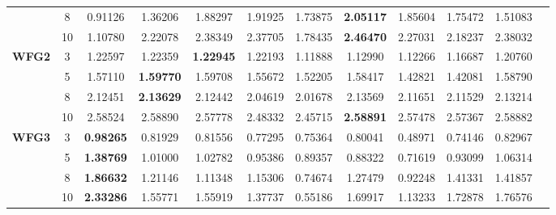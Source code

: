 \documentclass{sig-alternate}
\begin{document}
\begin{table*}[!htb]
\begin{tabular}{|c|c|c|c|c|c|c|c|c|c|c|c|}
& 8          & 0.91126          & 1.36206           & 1.88297               & 1.91925          & 1.73875             & \textbf{2.05117}    & 1.85604            & 1.75472              & 1.51083          \\ \cline{2-11} 
& 10         & 1.10780          & 2.22078           & 2.38349               & 2.37705          & 1.78435             & \textbf{2.46470}    & 2.27031            & 2.18237              & 2.38032          \\ \hline
\multirow{4}{*}{\textbf{WFG2}}  & 3          & 1.22597          & 1.22359           & \textbf{1.22945}      & 1.22193          & 1.11888             & 1.12990             & 1.12266            & 1.16687              & 1.20760          \\ \cline{2-11} 
& 5          & 1.57110          & \textbf{1.59770}  & 1.59708               & 1.55672          & 1.52205             & 1.58417             & 1.42821            & 1.42081              & 1.58790          \\ \cline{2-11} 
& 8          & 2.12451          & \textbf{2.13629}  & 2.12442               & 2.04619          & 2.01678             & 2.13569             & 2.11651            & 2.11529              & 2.13214          \\ \cline{2-11} 
& 10         & 2.58524          & 2.58890           & 2.57778               & 2.48332          & 2.45715             & \textbf{2.58891}    & 2.57478            & 2.57367              & 2.58882          \\ \hline
\multirow{4}{*}{\textbf{WFG3}}  & 3          & \textbf{0.98265} & 0.81929           & 0.81556               & 0.77295          & 0.75364             & 0.80041             & 0.48971            & 0.74146              & 0.82967          \\ \cline{2-11} 
& 5          & \textbf{1.38769} & 1.01000           & 1.02782               & 0.95386          & 0.89357             & 0.88322             & 0.71619            & 0.93099              & 1.06314          \\ \cline{2-11} 
& 8          & \textbf{1.86632} & 1.21146           & 1.11348               & 1.15306          & 0.74674             & 1.27479             & 0.92248            & 1.41331              & 1.41857          \\ \cline{2-11} 
& 10         & \textbf{2.33286} & 1.55771           & 1.55919               & 1.37737          & 0.55186             & 1.69917             & 1.13233            & 1.72878              & 1.76576          \\ \hline

\end{tabular}
\end{table*}
\end{document}
